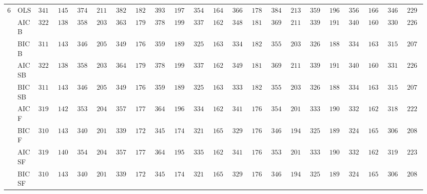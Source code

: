 \begin{tabular}{ll|ll|llllll|llllll|llllll}
6 & OLS  & $3416.08$ & $1453.28$ & $3740.49$ & $2115.34$ & $3820.92$ & $1828.70$ & $3939.45$ & $1978.31$ & $3540.52$ & $1645.90$ & $3666.41$ & $1785.13$ & $3844.98$ & $2133.05$ & $3598.89$ & $1964.95$ & $3568.65$ & $1669.64$ & $3469.61$ & $2291.74$ \\
 & AIC B  & $3220.16$ & $1383.38$ & $3589.31$ & $2034.33$ & $3636.60$ & $1795.53$ & $3781.95$ & $1993.58$ & $3373.34$ & $1624.77$ & $3483.19$ & $1811.93$ & $3694.69$ & $2117.88$ & $3393.78$ & $1918.89$ & $3403.66$ & $1606.88$ & $3306.95$ & $2264.20$ \\
 & BIC B  & $3113.66$ & $1430.16$ & $3460.08$ & $2059.92$ & $3496.18$ & $1767.32$ & $3590.24$ & $1897.56$ & $3252.85$ & $1637.29$ & $3340.98$ & $1826.53$ & $3555.73$ & $2035.95$ & $3262.57$ & $1881.76$ & $3341.54$ & $1638.03$ & $3152.95$ & $2075.80$ \\
 & AIC SB  & $3221.95$ & $1381.55$ & $3589.31$ & $2034.33$ & $3642.23$ & $1796.25$ & $3784.90$ & $1991.18$ & $3375.76$ & $1624.44$ & $3491.90$ & $1814.25$ & $3695.86$ & $2117.27$ & $3391.27$ & $1917.09$ & $3403.66$ & $1606.88$ & $3312.98$ & $2263.58$ \\
 & BIC SB  & $3113.66$ & $1430.16$ & $3460.08$ & $2059.92$ & $3496.18$ & $1767.32$ & $3594.29$ & $1894.40$ & $3250.56$ & $1638.71$ & $3335.71$ & $1822.40$ & $3554.98$ & $2036.75$ & $3264.74$ & $1881.76$ & $3342.98$ & $1639.56$ & $3154.19$ & $2076.11$ \\
 & AIC F  & $3196.10$ & $1423.35$ & $3539.03$ & $2042.14$ & $3578.16$ & $1778.22$ & $3648.79$ & $1960.31$ & $3349.17$ & $1622.79$ & $3416.14$ & $1768.94$ & $3540.33$ & $2012.35$ & $3331.11$ & $1907.99$ & $3324.51$ & $1629.43$ & $3182.74$ & $2228.08$ \\
 & BIC F  & $3108.18$ & $1437.73$ & $3405.44$ & $2013.75$ & $3398.22$ & $1728.91$ & $3456.21$ & $1745.66$ & $3219.23$ & $1657.99$ & $3298.42$ & $1765.76$ & $3466.19$ & $1949.73$ & $3253.74$ & $1890.02$ & $3248.38$ & $1658.12$ & $3069.18$ & $2083.13$ \\
 & AIC SF  & $3190.94$ & $1402.93$ & $3542.59$ & $2042.87$ & $3576.27$ & $1776.80$ & $3646.71$ & $1957.36$ & $3350.61$ & $1622.97$ & $3418.32$ & $1769.22$ & $3535.57$ & $2017.50$ & $3331.03$ & $1908.06$ & $3329.64$ & $1629.89$ & $3191.37$ & $2235.85$ \\
 & BIC SF  & $3105.66$ & $1439.27$ & $3404.96$ & $2014.40$ & $3398.22$ & $1728.91$ & $3455.33$ & $1743.32$ & $3219.23$ & $1657.99$ & $3298.42$ & $1765.76$ & $3464.77$ & $1946.41$ & $3253.74$ & $1890.02$ & $3248.38$ & $1658.12$ & $3069.18$ & $2083.13$ \\

\end{tabular}
